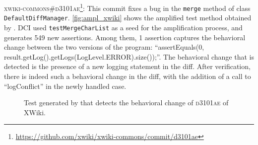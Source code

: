 \textsc{xwiki-commons\#d3101ae}\footnote{\url{https://github.com/xwiki/xwiki-commons/commit/d3101ae}}: This commit fixes a bug in the \texttt{merge} method of class \texttt{DefaultDiffManager}.
\autoref{fig:ampl_xwiki} shows the amplified test method obtained by \DCIA.
DCI used \texttt{testMergeCharList} as a seed for the amplification process, and generates 549 new assertions.
Among them, 1 assertion captures the behavioral change between the two versions of the program: 
``assertEquals(0, result.getLog().getLogs(LogLevel.ERROR).size());''.
The behavioral change that is detected is the presence of a new logging statement in the diff. After verification, there is indeed such a behavioral change in the diff, with the addition of a call to ``logConflict'' in the newly handled case.

\begin{figure}[h]
\centering
{}
\caption{Test generated by \DCIA that detects the behavioral change of \textsc{d3101ae} of XWiki.}
\label{fig:ampl_xwiki}
\end{figure}

